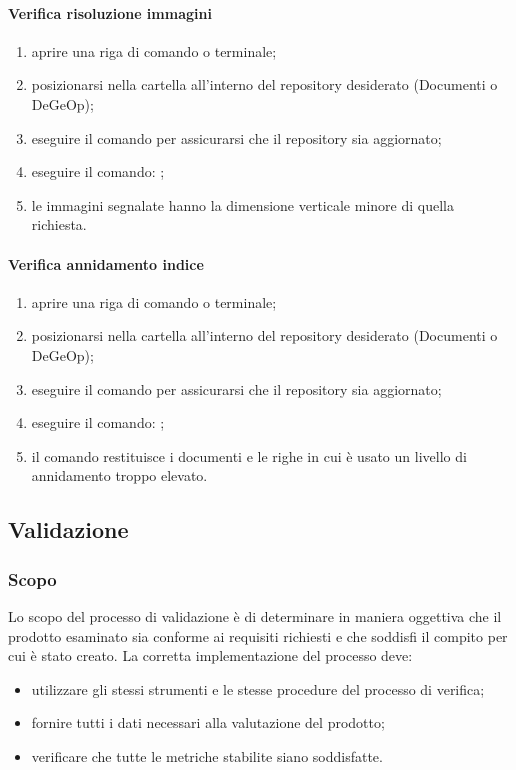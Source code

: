 	        \paragraph{Verifica risoluzione immagini} \label{sec:imageRes}
	        \begin{enumerate}
	        	\item aprire una riga di comando o terminale;
	        	\item posizionarsi nella cartella  all'interno del repository desiderato (Documenti o DeGeOp);
	        	\item eseguire il comando  per assicurarsi che il repository sia aggiornato;
	        	\item eseguire il comando: ;
	        	\item le immagini segnalate hanno la dimensione verticale minore di quella richiesta.
	        \end{enumerate}
	        \paragraph{Verifica annidamento indice} \label{sec:ssPar}
	        \begin{enumerate}
	        	\item aprire una riga di comando o terminale;
	        	\item posizionarsi nella cartella  all'interno del repository desiderato (Documenti o DeGeOp);
	        	\item eseguire il comando  per assicurarsi che il repository sia aggiornato;
	        	\item eseguire il comando: ;
	        	\item il comando restituisce i documenti e le righe in cui è usato un livello di annidamento troppo elevato.
	        \end{enumerate} 

    \subsection{Validazione}
    \subsubsection{Scopo}
    Lo scopo del processo di validazione è di determinare in maniera oggettiva che il prodotto esaminato sia conforme ai requisiti richiesti e che soddisfi il compito per cui è stato creato.  La corretta implementazione del processo deve:
    \begin{itemize}
        \item utilizzare gli stessi strumenti e le stesse procedure del processo di verifica;
        \item fornire tutti i dati necessari alla valutazione del prodotto;
        \item verificare che tutte le metriche stabilite siano soddisfatte.
    \end{itemize}
